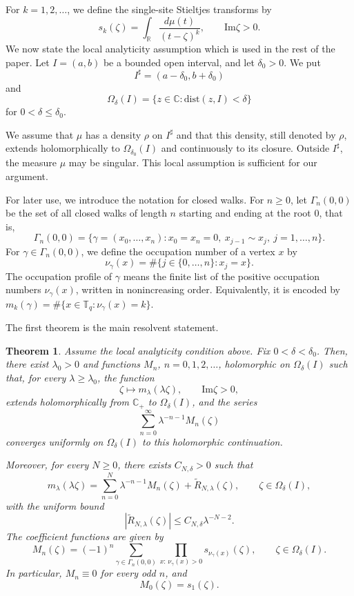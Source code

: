 \documentclass[a4paper,11pt]{article}
\newtheorem{thm}{Theorem}[section]
\newcommand{\Impart}{\mathrm{Im}}
\newcommand{\dist}{\mathrm{dist}}
\begin{document}
For $k=1,2,\dots$, we define the single-site Stieltjes transforms by
\begin{equation}
\label{eq:single-site-transform}
s_k(\zeta)
=
\int_{\mathbb R}\frac{d\mu(t)}{(t-\zeta)^k},
\qquad
\Impart \zeta>0.
\end{equation}
%
We now state the local analyticity assumption which is used in the rest of the paper. 
Let $I=(a,b)$ be a bounded open interval, and let $\delta_0>0$. 
We put
$$
I^{\sharp}=(a-\delta_0,b+\delta_0)
$$
and
$$
\Omega_\delta(I)=\{z\in\mathbb C:\dist(z,I)<\delta\}
$$
for $0<\delta\le \delta_0$.

We assume that $\mu$ has a density $\rho$ on $I^{\sharp}$ and that
this density, still denoted by $\rho$, extends holomorphically to
$\Omega_{\delta_0}(I)$ and continuously to its closure.
Outside $I^{\sharp}$, the measure $\mu$ may be singular. 
This local assumption is sufficient for our argument.

For later use, we introduce the notation for closed walks. 
For $n\ge0$, let $\Gamma_n(0,0)$ be the set of all closed walks of length $n$
starting and ending at the root $0$, that is,
$$
\Gamma_n(0,0)=\{\gamma=(x_0,\ldots,x_n): x_0=x_n=0,\ 
x_{j-1}\sim x_j,\ j=1,\ldots,n\}.
$$
For $\gamma\in\Gamma_n(0,0)$, we define the occupation number of a vertex $x$ by
$$
\nu_\gamma(x) = \#\{j\in\{0,\ldots,n\}: x_j=x\}.
$$
The occupation profile of $\gamma$ means the finite list of the positive
occupation numbers $\nu_\gamma(x)$, written in nonincreasing order.
Equivalently, it is encoded by $m_k(\gamma)=\#\{x\in \mathbb T_q:\nu_\gamma(x)=k\}$.

The first theorem is the main resolvent statement.

\begin{thm}\label{thm:main-resolvent}
Assume the local analyticity condition above. 
Fix $0<\delta<\delta_0$.
Then, there exist $\lambda_0>0$ and functions $M_n$, $n=0,1,2,\ldots$,
holomorphic on $\Omega_\delta(I)$ such that, 
for every $\lambda\ge\lambda_0$, the function
$$
\zeta\mapsto m_\lambda(\lambda\zeta),
\qquad \Impart\zeta>0,
$$
extends holomorphically from $\mathbb C_+$ to $\Omega_\delta(I)$, and
the series
$$
\sum_{n=0}^{\infty}\lambda^{-n-1}M_n(\zeta)
$$
converges uniformly on $\Omega_\delta(I)$ to this holomorphic continuation.

Moreover, for every $N\ge0$, there exists $C_{N,\delta}>0$ such that
\begin{equation}
\label{eq:main-resolvent-expansion-zeta}
m_\lambda(\lambda\zeta)=\sum_{n=0}^{N}\lambda^{-n-1}M_n(\zeta)
+\widetilde R_{N,\lambda}(\zeta),\qquad\zeta\in\Omega_\delta(I),
\end{equation}
with the uniform bound
$$
|\widetilde R_{N,\lambda}(\zeta)|
\le
C_{N,\delta}\lambda^{-N-2}.
$$
The coefficient functions are given by
\begin{equation}
\label{eq:Mn-formula-statement}
M_n(\zeta)
=
(-1)^n
\sum_{\gamma\in\Gamma_n(0,0)}
\prod_{x:\,\nu_\gamma(x)>0}
s_{\nu_\gamma(x)}(\zeta),
\qquad
\zeta\in\Omega_\delta(I).
\end{equation}
In particular, $M_n\equiv0$ for every odd $n$, and
$$
M_0(\zeta)=s_1(\zeta).
$$
\end{thm}
\end{document}
